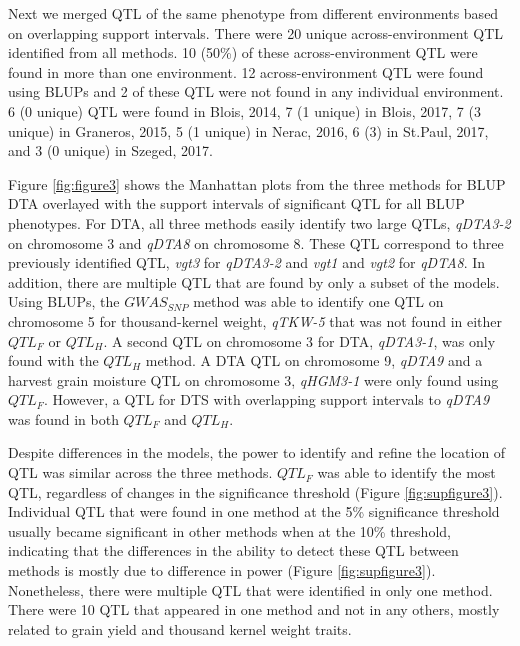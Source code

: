 \documentclass[article,9pt,twocolumn,twoside]{rilabRxiv}
\begin{document}
Next we merged QTL of the same phenotype from different environments based on overlapping support intervals.
There were 20 unique across-environment QTL identified from all methods.
10 (50\%) of these across-environment QTL were found in more than one environment.
12 across-environment QTL were found using BLUPs and 2 of these QTL were not found in any individual environment.
6 (0 unique) QTL were found in Blois, 2014, 7 (1 unique) in Blois, 2017, 7 (3 unique) in Graneros, 2015, 5 (1 unique) in Nerac, 2016, 6 (3) in St.Paul, 2017, and 3 (0 unique) in Szeged, 2017.

Figure \ref{fig:figure3} shows the Manhattan plots from the three methods for BLUP DTA overlayed with the support intervals of significant QTL for all BLUP phenotypes.
For DTA, all three methods easily identify two large QTLs, \emph{qDTA3-2} on chromosome 3 and \emph{qDTA8} on chromosome 8. These QTL correspond to three previously identified QTL, \emph{vgt3} for \emph{qDTA3-2} and \emph{vgt1} and \emph{vgt2} for \emph{qDTA8}.
In addition, there are multiple QTL that are found by only a subset of the models.
Using BLUPs, the $GWAS_{SNP}$ method was able to identify one QTL on chromosome 5 for thousand-kernel weight, \emph{qTKW-5} that was not found in either $QTL_F$ or $QTL_H$.
A second QTL on chromosome 3 for DTA, \emph{qDTA3-1}, was only found with the $QTL_H$ method.
A DTA QTL on chromosome 9, \emph{qDTA9} and a harvest grain moisture QTL on chromosome 3, \emph{qHGM3-1} were only found using $QTL_F$.
However, a QTL for DTS with overlapping support intervals to \emph{qDTA9} was found in both $QTL_F$ and $QTL_H$.

Despite differences in the models, the power to identify and refine the location of QTL was similar across the three methods.
$QTL_F$ was able to identify the most QTL, regardless of changes in the significance threshold (Figure \ref{fig:supfigure3}).
Individual QTL that were found in one method at the 5\% significance threshold usually became significant in other methods when at the 10\% threshold, indicating that the differences in the ability to detect these QTL between methods is mostly due to difference in power (Figure \ref{fig:supfigure3}).
Nonetheless, there were multiple QTL that were identified in only one method. There were 10 QTL that appeared in one method and not in any others, mostly related to grain yield and thousand kernel weight traits.
\end{document}
